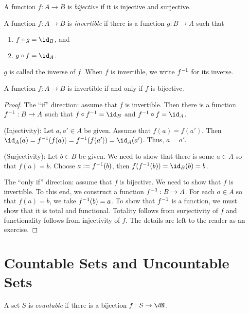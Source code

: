 \documentclass{amsart}
\begin{document}
\begin{defn}
  A function $f : A \to B$ is \emph{bijective} if it is injective and surjective.
\end{defn}

\begin{defn}
  A function $f : A \to B$ is \emph{invertible} if there is a function $g : B \to A$ such that
  \begin{enumerate}
  \item $f \circ g = \id_{B}$, and
  \item $g \circ f = \id_{A}$.
  \end{enumerate}
  $g$ is called the inverse of $f$.
  When $f$ is invertible, we write $f^{-1}$ for its inverse.
\end{defn}

\begin{thm}
  A function $f : A \to B$ is invertible if and only if $f$ is bijective.
\end{thm}
\begin{proof}
  The ``if'' direction: assume that $f$ is invertible.
  Then there is a function $f^{-1} : B \to A$ such that $f \circ f\inv = \id_{B}$ and $f\inv \circ f = \id_{A}$.

  (Injectivity): Let $a, a' \in A$ be given.
  Assume that $f(a) = f(a')$.
  Then $\id_{A}(a) = f\inv(f(a)) = f\inv(f(a')) = \id_{A}(a')$.
  Thus, $a = a'$.

  (Surjectivity): Let $b \in B$ be given.
  We need to show that there is some $a \in A$ so that $f(a) = b$.
  Choose $a := f^{-1}(b)$, then $f(f\inv(b)) = \id_{B}(b) = b$.

  The ``only if'' direction: assume that $f$ is bijective.
  We need to show that $f$ is invertible.
  To this end, we construct a function $f^{-1} : B \to A$.
  For each $a \in A$ so that $f(a) = b$, we take $f^{-1}(b) = a$.
  To show that $f^{-1}$ is a function, we must show that it is total and functional.
  Totality follows from surjectivity of $f$ and functionality follows from injectivity of $f$.
  The details are left to the reader as an exercise.
\end{proof}

\section{Countable Sets and Uncountable Sets}
\label{sec:countable-sets-and-uncountable-sets}

\begin{defn}
  A set $S$ is \emph{countable} if there is a bijection $f : S \to \dN$.
\end{defn}
\end{document}
